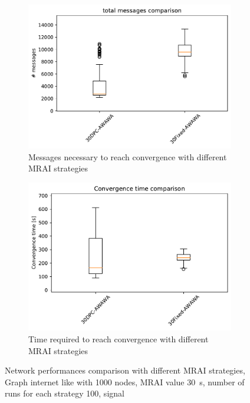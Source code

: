 \begin{figure}[h]
     \centering
     \begin{subfigure}[b]{0.49\textwidth}
         \centering
         \includegraphics[width=\textwidth]{images/internet_like/1000/comparison/comparison_AWAWA_messages_boxplot.pdf}
		 \caption{Messages necessary to reach convergence
			with different \ac{MRAI} strategies}
         \label{fig:boxplot_internet_like_1000_messages_AWAWA}
     \end{subfigure}
     \hfill
     \begin{subfigure}[b]{0.49\textwidth}
         \centering
         \includegraphics[width=\textwidth]{images/internet_like/1000/comparison/comparison_AWAWA_time_boxplot.pdf}
		 \caption{Time required to reach convergence
			with different \ac{MRAI} strategies}
         \label{fig:boxplot_internet_like_1000_time_AWAWA}
     \end{subfigure}
	 \caption{Network performances comparison with different \ac{MRAI} strategies,
		Graph internet like with \num{1000} nodes, \ac{MRAI} value
		\SI{30}{\second}, number of runs for each strategy \num{100}, signal }
        \label{fig:boxplot_internet_like_1000_AWAWA}
\end{figure}

